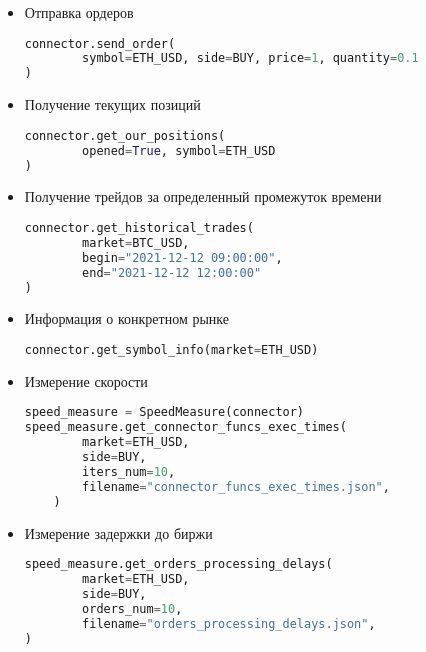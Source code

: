 \begin{itemize}

\item Отправка ордеров
\begin{lstlisting}[language=Python]
connector.send_order(
        symbol=ETH_USD, side=BUY, price=1, quantity=0.1
)
\end{lstlisting}

\item Получение текущих позиций
\begin{lstlisting}[language=Python]
connector.get_our_positions(
        opened=True, symbol=ETH_USD
)
\end{lstlisting}

\item Получение трейдов за определенный промежуток времени
\begin{lstlisting}[language=Python]
connector.get_historical_trades(
        market=BTC_USD,
        begin="2021-12-12 09:00:00",
        end="2021-12-12 12:00:00"
)
\end{lstlisting}

\item Информация о конкретном рынке
\begin{lstlisting}[language=Python]
connector.get_symbol_info(market=ETH_USD)
\end{lstlisting}

\item Измерение скорости
\begin{lstlisting}[language=Python]
speed_measure = SpeedMeasure(connector)
speed_measure.get_connector_funcs_exec_times(
        market=ETH_USD,
        side=BUY,
        iters_num=10,
        filename="connector_funcs_exec_times.json",
    )
\end{lstlisting}

\item Измерение задержки до биржи
\begin{lstlisting}[language=Python]
speed_measure.get_orders_processing_delays(
        market=ETH_USD,
        side=BUY,
        orders_num=10,
        filename="orders_processing_delays.json",
)
\end{lstlisting}

\end{itemize}
